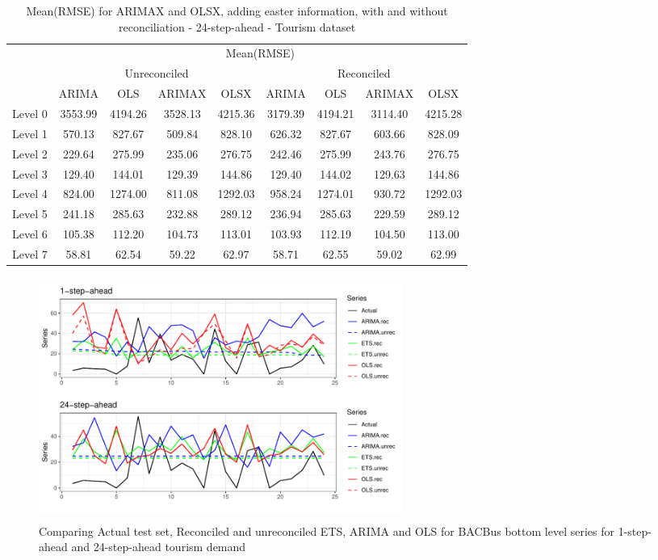 \documentclass[11pt,a4paper,]{article}
\begin{document}
\begin{table}[t]

\caption{\label{tab:easterRMSE}Mean(RMSE) for ARIMAX and OLSX, adding easter information, with and without reconciliation - 24-step-ahead - Tourism dataset}
\centering
\begin{tabular}{ccccccccc}
\toprule
\multicolumn{1}{c}{} & \multicolumn{8}{c}{Mean(RMSE)} \\
\cmidrule(l{2pt}r{2pt}){2-9}
\multicolumn{1}{c}{} & \multicolumn{4}{c}{Unreconciled} & \multicolumn{4}{c}{Reconciled} \\
\cmidrule(l{2pt}r{2pt}){2-5} \cmidrule(l{2pt}r{2pt}){6-9}
 & ARIMA & OLS & ARIMAX & OLSX & ARIMA & OLS & ARIMAX & OLSX\\
\midrule
Level 0 & 3553.99 & 4194.26 & 3528.13 & 4215.36 & 3179.39 & 4194.21 & 3114.40 & 4215.28\\
Level 1 & 570.13 & 827.67 & 509.84 & 828.10 & 626.32 & 827.67 & 603.66 & 828.09\\
Level 2 & 229.64 & 275.99 & 235.06 & 276.75 & 242.46 & 275.99 & 243.76 & 276.75\\
Level 3 & 129.40 & 144.01 & 129.39 & 144.86 & 129.40 & 144.02 & 129.63 & 144.86\\
Level 4 & 824.00 & 1274.00 & 811.08 & 1292.03 & 958.24 & 1274.01 & 930.72 & 1292.03\\
Level 5 & 241.18 & 285.63 & 232.88 & 289.12 & 236.94 & 285.63 & 229.59 & 289.12\\
Level 6 & 105.38 & 112.20 & 104.73 & 113.01 & 103.93 & 112.19 & 104.50 & 113.00\\
Level 7 & 58.81 & 62.54 & 59.22 & 62.97 & 58.71 & 62.55 & 59.02 & 62.99\\
\bottomrule
\end{tabular}
\end{table}

\begin{figure}

{\centering \includegraphics[width=450px,height=300px]{hcf_files/figure-latex/forecstrolling24tourism-1} 

}

\caption{Comparing Actual test set, Reconciled and unreconciled ETS, ARIMA and OLS for BACBus bottom level series for 1-step-ahead and  24-step-ahead tourism demand}\label{fig:forecstrolling24tourism}
\end{figure}
\end{document}
